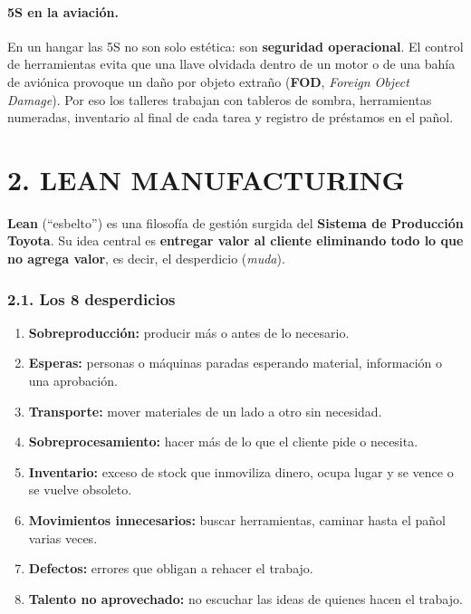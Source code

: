 \paragraph*{5S en la aviación.}
En un hangar las 5S no son solo estética: son \textbf{seguridad operacional}. El control de
herramientas evita que una llave olvidada dentro de un motor o de una bahía de aviónica
provoque un daño por objeto extraño (\textbf{FOD}, \textit{Foreign Object Damage}). Por eso
los talleres trabajan con tableros de sombra, herramientas numeradas, inventario al final de
cada tarea y registro de préstamos en el pañol.

\section*{2. LEAN MANUFACTURING}

\textbf{Lean} (``esbelto'') es una filosofía de gestión surgida del \textbf{Sistema de
Producción Toyota}. Su idea central es \textbf{entregar valor al cliente eliminando todo lo que
no agrega valor}, es decir, el desperdicio (\textit{muda}).

\subsubsection*{2.1. Los 8 desperdicios}
\begin{enumerate}
  \item \textbf{Sobreproducción:} producir más o antes de lo necesario.
  \item \textbf{Esperas:} personas o máquinas paradas esperando material, información o una
        aprobación.
  \item \textbf{Transporte:} mover materiales de un lado a otro sin necesidad.
  \item \textbf{Sobreprocesamiento:} hacer más de lo que el cliente pide o necesita.
  \item \textbf{Inventario:} exceso de stock que inmoviliza dinero, ocupa lugar y se vence o
        se vuelve obsoleto.
  \item \textbf{Movimientos innecesarios:} buscar herramientas, caminar hasta el pañol varias
        veces.
  \item \textbf{Defectos:} errores que obligan a rehacer el trabajo.
  \item \textbf{Talento no aprovechado:} no escuchar las ideas de quienes hacen el trabajo.
\end{enumerate}


